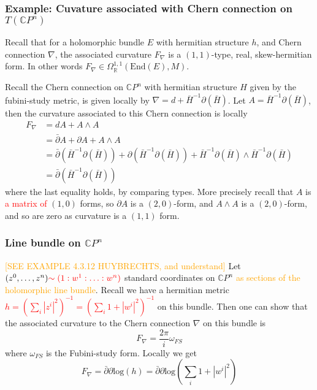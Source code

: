 \documentclass[a4paper]{article}
\theoremstyle{definition} \newtheorem*{definition}{Definition}
\theoremstyle{definition} \newtheorem*{definitions}{Definitions}
\theoremstyle{plain} \newtheorem{theorem}{Theorem}[section]
\theoremstyle{plain} \newtheorem{proposition}[theorem]{Proposition}
\theoremstyle{plain} \newtheorem{corollary}[theorem]{Corollary}
\theoremstyle{plain} \newtheorem{lemma}[theorem]{Lemma}
\theoremstyle{plain} \newtheorem{example}[theorem]{Example}
\newcommand{\checkCorrect}[1]{\textcolor{red}{#1}}
\newcommand{\understandBetter}[1]{\textcolor{orange}{#1}}
\newcommand{\realnos}{\mathbb{R}}
\newcommand{\complexnos}{\mathbb{C}}
\newcommand{\End}{\text{End}}
\begin{document}
\subsubsection{Example: Cuvature associated with Chern connection on $T (\complexnos P^n)$}

Recall that for a holomorphic bundle $E$ with hermitian structure $h$, and Chern connection $\nabla$, the associated curvature $F_\nabla$ is a $(1,1)$-type, real, skew-hermitian form. In other words $F_\nabla\in \Omega^{1,1}_\realnos (\End(E), M)$.

Recall the Chern connection on $\complexnos P^n$ with hermitian structure $H$ given by the fubini-study metric, is given locally by $\nabla = d+\bar{H}^{-1}\partial(\bar{H})$. Let $A=\bar{H}^{-1}\partial(\bar{H})$, then the curvature associated to this Chern connection is locally 
\begin{align*}
    F_\nabla & = dA + A\wedge A \\
    & = \bar{\partial} A + \partial A + A\wedge A \\
    & = \bar{\partial}(\bar{H}^{-1}\partial(\bar{H})) + \partial(\bar{H}^{-1}\partial(\bar{H})) + \bar{H}^{-1}\partial(\bar{H}) \wedge \bar{H}^{-1}\partial(\bar{H}) \\
    & = \bar{\partial}(\bar{H}^{-1}\partial(\bar{H}))
\end{align*}
where the last equality holds, by comparing types. More precisely recall that $A$ is \checkCorrect{a matrix of} $(1, 0)$ forms, so $\partial A$ is a $(2,0)$-form, and $A\wedge A$ is a $(2,0)$-form, and so are zero as curvature is a $(1,1)$ form.

\subsubsection{Line bundle on $\complexnos P^n$}
\understandBetter{[SEE EXAMPLE 4.3.12 HUYBRECHTS, and understand]}
Let $(z^0, \ldots, z^n) \checkCorrect{\sim (1: w^1: \ldots : w^n)}$ standard coordinates on $\complexnos P^n$ \understandBetter{as sections of the holomorphic line bundle}. Recall we have a hermitian metric \checkCorrect{$h=(\sum_i |z^i|^2)^{-1}=(\sum_i 1+|w^i|^2)^{-1}$} on this bundle. Then one can show that the associated curvature to the Chern connection $\nabla$ on this bundle is
$$F_\nabla = \frac{2\pi}{i} \omega_{FS} $$
where $\omega_{FS}$ is the Fubini-study form. Locally we get 
$$F_\nabla = \bar{\partial}\partial \text{log}(h) = \bar{\partial}\partial \text{log}(\sum_i 1+|w^i|^2)$$
\end{document}
